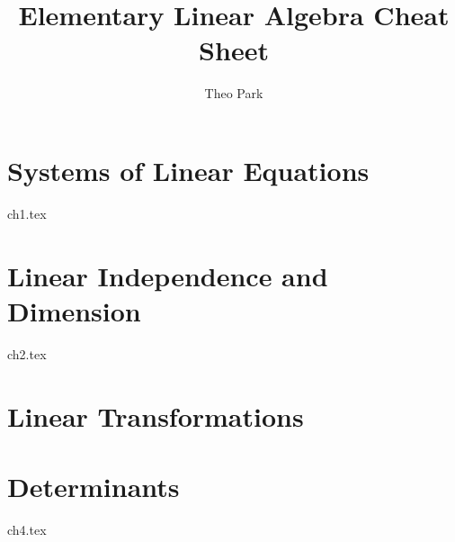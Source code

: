 \documentclass{report}
\title{Elementary Linear Algebra Cheat Sheet}
\author{Theo Park}
\date{}
\begin{document}
\maketitle

\pagestyle{fancy}


\tableofcontents


\chapter{Systems of Linear Equations}

{ch1.tex}


\chapter{Linear Independence and Dimension}

{ch2.tex}


\chapter{Linear Transformations}



\chapter{Determinants}

{ch4.tex}
\end{document}
